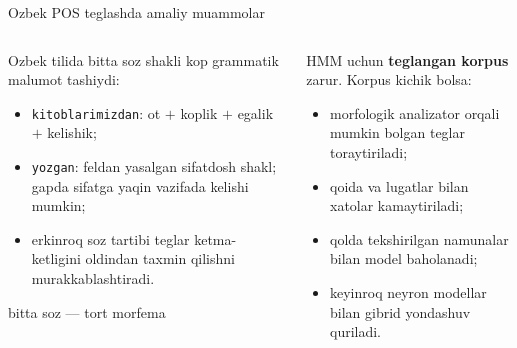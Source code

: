 \documentclass[aspectratio=169,11pt]{beamer}
\newcommand{\uzq}{\textquotesingle{}}
\begin{document}
\begin{frame}{O\uzq{}zbek POS teglashda amaliy muammolar}
\footnotesize

\begin{columns}[T,totalwidth=\textwidth]
\begin{column}{0.52\textwidth}

O\uzq{}zbek tilida bitta so\uzq{}z shakli ko\uzq{}p grammatik ma\uzq{}lumot tashiydi:

\begin{itemize}\setlength\itemsep{3pt}
  \item \texttt{kitoblarimizdan}: ot $+$ ko\uzq{}plik $+$ egalik $+$ kelishik;
  \item \texttt{yozgan}: fe\uzq{}ldan yasalgan sifatdosh shakl; gapda sifatga
        yaqin vazifada kelishi mumkin;
  \item erkinroq so\uzq{}z tartibi teglar ketma-ketligini oldindan taxmin qilishni
        murakkablashtiradi.
\end{itemize}

\vspace{3pt}
\centering
{}

\vspace{2pt}
{\scriptsize bitta so\uzq{}z --- to\uzq{}rt morfema}

\end{column}

\begin{column}{0.46\textwidth}

\begin{tcolorbox}[okbox,title=Amaliy yechimlar,
left=2mm,right=2mm,top=1mm,bottom=1mm]
\footnotesize
HMM uchun \textbf{teglangan korpus} zarur. Korpus kichik bo\uzq{}lsa:

\begin{itemize}\setlength\itemsep{3pt}
  \item morfologik analizator orqali mumkin bo\uzq{}lgan teglar toraytiriladi;
  \item qoida va lug\uzq{}atlar bilan xatolar kamaytiriladi;
  \item qo\uzq{}lda tekshirilgan namunalar bilan model baholanadi;
  \item keyinroq neyron modellar bilan gibrid yondashuv quriladi.
\end{itemize}
\end{tcolorbox}


\end{column}
\end{columns}
\end{frame}
\end{document}
